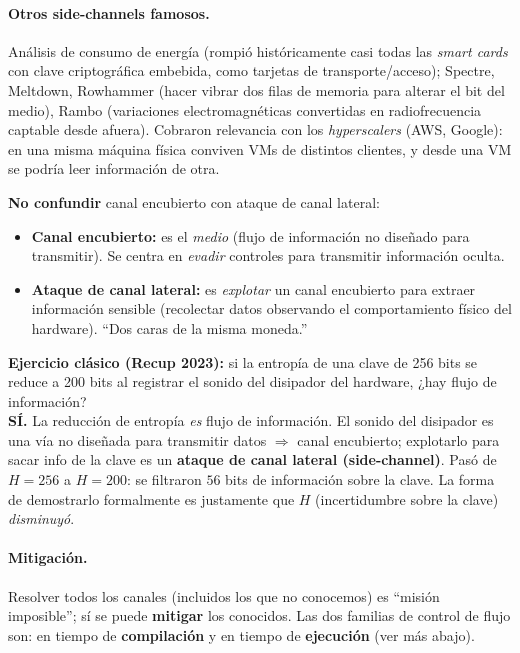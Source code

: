 \documentclass[../main.tex]{subfiles}
\begin{document}
\paragraph{Otros side-channels famosos.} Análisis de consumo de energía (rompió
históricamente casi todas las \textit{smart cards} con clave criptográfica
embebida, como tarjetas de transporte/acceso); Spectre, Meltdown, Rowhammer (hacer
vibrar dos filas de memoria para alterar el bit del medio), Rambo (variaciones
electromagnéticas convertidas en radiofrecuencia captable desde afuera). Cobraron
relevancia con los \textit{hyperscalers} (AWS, Google): en una misma máquina física
conviven VMs de distintos clientes, y desde una VM se podría leer información de otra.

\begin{ojo}
\textbf{No confundir} canal encubierto con ataque de canal lateral:
\begin{itemize}[noitemsep]
  \item \textbf{Canal encubierto:} es el \emph{medio} (flujo de información no
        diseñado para transmitir). Se centra en \emph{evadir} controles para
        transmitir información oculta.
  \item \textbf{Ataque de canal lateral:} es \emph{explotar} un canal encubierto
        para extraer información sensible (recolectar datos observando el
        comportamiento físico del hardware). ``Dos caras de la misma moneda.''
\end{itemize}
\end{ojo}

\begin{examen}
\textbf{Ejercicio clásico (Recup 2023):} si la entropía de una clave de 256 bits
se reduce a 200 bits al registrar el sonido del disipador del hardware,
¿hay flujo de información?\\
\textbf{SÍ.} La reducción de entropía \emph{es} flujo de información. El sonido del
disipador es una vía no diseñada para transmitir datos $\Rightarrow$ canal
encubierto; explotarlo para sacar info de la clave es un \textbf{ataque de canal
lateral (side-channel)}. Pasó de $H = 256$ a $H = 200$: se filtraron $56$ bits de
información sobre la clave. La forma de demostrarlo formalmente es justamente que
$H$ (incertidumbre sobre la clave) \emph{disminuyó}.
\end{examen}

\paragraph{Mitigación.} Resolver todos los canales (incluidos los que no
conocemos) es ``misión imposible''; sí se puede \textbf{mitigar} los conocidos.
Las dos familias de control de flujo son: en tiempo de \textbf{compilación} y en
tiempo de \textbf{ejecución} (ver más abajo).
\end{document}
